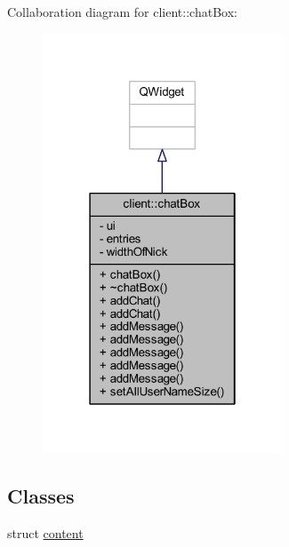 Collaboration diagram for client\-:\-:chat\-Box\-:\nopagebreak
\begin{figure}[H]
\begin{center}
\leavevmode
\includegraphics[width=202pt]{d0/d09/classclient_1_1chat_box__coll__graph}
\end{center}
\end{figure}
\subsection*{Classes}
\begin{DoxyCompactItemize}
\item 
struct \hyperlink{structclient_1_1chat_box_1_1content}{content}
\end{DoxyCompactItemize}
